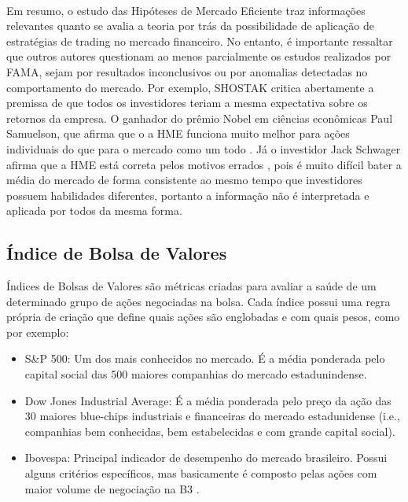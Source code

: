 \paragraph{} Em resumo, o estudo das Hipóteses de Mercado Eficiente traz informações relevantes quanto se avalia a teoria por trás da possibilidade de aplicação de estratégias de trading no mercado financeiro. No entanto, é importante ressaltar que outros autores questionam ao menos parcialmente os estudos realizados por FAMA, sejam por resultados inconclusivos ou por anomalias detectadas no comportamento do mercado. Por exemplo, SHOSTAK \cite{shostak1997defense} critica abertamente a premissa de que todos os investidores teriam a mesma expectativa sobre os retornos da empresa. O ganhador do prêmio Nobel em ciências econômicas Paul Samuelson, que afirma que o a HME funciona muito melhor para ações individuais do que para o mercado como um todo \cite{jung2005samuelson}. Já o investidor Jack Schwager afirma que a HME está correta pelos motivos errados \cite{schwager2012market}, pois é muito difícil bater a média do mercado de forma consistente ao mesmo tempo que investidores possuem habilidades diferentes, portanto a informação não é interpretada e aplicada por todos da mesma forma.

\subsection{Índice de Bolsa de Valores}

Índices de Bolsas de Valores \cite{stock_index} são métricas criadas para avaliar a saúde de um determinado grupo de ações negociadas na bolsa. Cada índice possui uma regra própria de criação que define quais ações são englobadas e com quais pesos, como por exemplo:

\begin{itemize}
    \item S\&P 500: Um dos mais conhecidos no mercado. É a média ponderada pelo capital social das 500 maiores companhias do mercado estadunindense.
    \item Dow Jones Industrial Average: É a média ponderada pelo preço da ação das 30 maiores blue-chips industriais e financeiras do mercado estadunidense (i.e., companhias bem conhecidas, bem estabelecidas e com grande capital social).
    \item Ibovespa: Principal indicador de desempenho do mercado brasileiro. Possui alguns critérios específicos, mas basicamente é composto pelas ações com maior volume de negociação na B3 \cite{ibovespa}.
\end{itemize}

